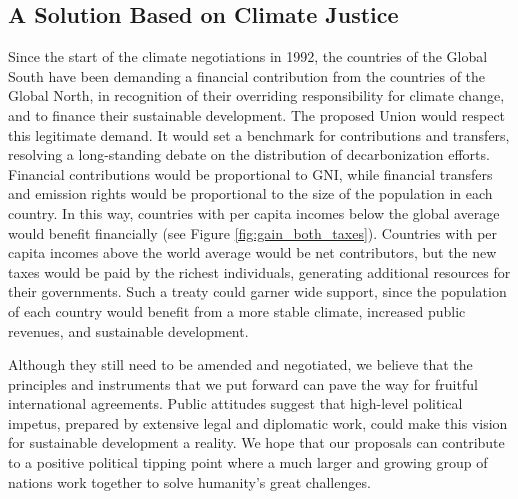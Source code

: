 \documentclass[12pt,english]{article}
\begin{document}
\begin{bibunit}
\subsection*{A Solution Based on Climate Justice}
Since the start of the climate negotiations in 1992, the countries of the Global South have been demanding a financial contribution from the countries of the Global North, in recognition of their overriding responsibility for climate change, and to finance their sustainable development. The proposed Union would respect this legitimate demand. It would set a benchmark for contributions and transfers, resolving a long-standing debate on the distribution of decarbonization efforts. Financial contributions would be proportional to GNI, while financial transfers and emission rights would be proportional to the size of the population in each country. In this way, countries with per capita incomes below the global average would benefit financially (see Figure \ref{fig:gain_both_taxes}). Countries with per capita incomes above the world average would be net contributors, but the new taxes would be paid by the richest individuals, generating additional resources for their governments. Such a treaty could garner wide support, since the population of each country would benefit from a more stable climate, increased public revenues, and sustainable development.

Although they still need to be amended and negotiated, we believe that the principles and instruments that we put forward can pave the way for fruitful international agreements. Public attitudes suggest that high-level political impetus, prepared by extensive legal and diplomatic work, could make this vision for sustainable development a reality. We hope that our proposals can contribute to a positive political tipping point where a much larger and growing group of nations work together to solve humanity's great challenges.

\renewcommand{\url}[1]{\href{#1}{Link}} %
% 
\putbib
\end{bibunit}
\end{document}
